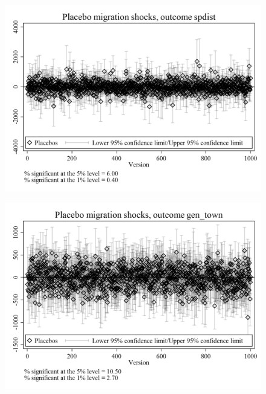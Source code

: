 \documentclass{article}
\begin{document}
\clearpage
\begin{figure}
	\centering
	\includegraphics[width=.8\textwidth]{figures/exogeneity_tests/D17_placebo_spdist_urban.png}
\end{figure}
\clearpage
\begin{figure}
	\centering
	\includegraphics[width=.8\textwidth]{figures/exogeneity_tests/D17_placebo_gen_town_urban.png}
\end{figure}
\clearpage
\end{document}
